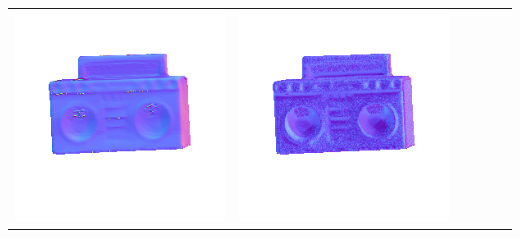 \begin{center}
\begin{tabularx}{\linewidth}{@{}Y@{}Y@{}Y@{}Y@{}Y@{}Y@{}}
\includegraphics[width=\linewidth]{semisynthetic/20160617_19_yu_out.png} &
\includegraphics[width=\linewidth]{semisynthetic/20160617_19_dpsn_out.png} &

\end{tabularx}
\end{center}
